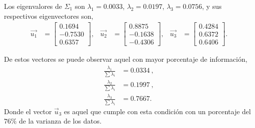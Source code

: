 Los eigenvalores de $\Sigma_1$ son $\lambda_1 = 0.0033$, $\lambda_2 = 0.0197$, $\lambda_3 = 0.0756$, y sus respectivos eigenvectores son,
\begin{align*}
    \vec{u_1} & =
    \begin{bmatrix}
        0.1694 \\
        -0.7530 \\
        0.6357
    \end{bmatrix}, &
    \vec{u_2} & = 
    \begin{bmatrix}
        0.8875 \\
        -0.1638 \\
        -0.4306
    \end{bmatrix}, &
    \vec{u_3} & =
    \begin{bmatrix}
        0.4284 \\
        0.6372 \\
        0.6406
    \end{bmatrix}.
\end{align*}

De estos vectores se puede observar aquel con mayor porcentaje de información,
\begin{align*}
    \frac{\lambda_1}{\sum \lambda_i} & = 0.0334\ , \\
    \frac{\lambda_2}{\sum \lambda_i} & = 0.1997\ , \\
    \frac{\lambda_3}{\sum \lambda_i} & = 0.7667 .
\end{align*}
Donde el vector $\vec{u}_3$ es aquel que cumple con esta condición con un porcentaje del $76\%$ de la varianza de los datos.


